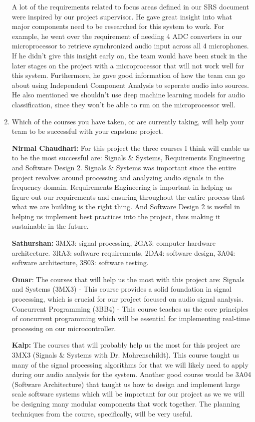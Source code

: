 \begin{enumerate}
  A lot of the requirements related to focus areas defined in our SRS document
  were inspired by our project supervisor. He gave great insight into what major
  components need to be researched for this system to work. For example, he went
  over the requirement of needing 4 ADC converters in our microprocessor to
  retrieve synchronized audio input across all 4 microphones. If he didn't give
  this insight early on, the team would have been stuck in the later stages on
  the project with a microprocessor that will not work well for this system.
  Furthermore, he gave good information of how the team can go about using
  Independent Component Analysis to seperate audio into sources. He also
  mentioned we shouldn't use deep machine learning models for audio
  classification, since they won't be able to run on the microprocessor well. 

  
  \item Which of the courses you have taken, or are currently taking, will help
  your team to be successful with your capstone project.

  \textbf{Nirmal Chaudhari: } For this project the three courses I think will
  enable us to be the most successful are: Signals \& Systems, Requirements
  Engineering and Software Design 2. Signals \& Systems was important since the
  entire project revolves around processing and analyzing audio signals in the
  frequency domain. Requirements Engineering is important in helping us figure
  out our requirements and ensuring throughout the entire process that what we
  are building is the right thing. And Software Design 2 is useful in helping us
  implement best practices into the project, thus making it sustainable in the
  future.

  \textbf{Sathurshan:} 3MX3: signal processing, 2GA3: computer hardware
  architecture. 3RA3: software requirements, 2DA4: software design, 3A04:
  software architecture, 3S03: software testing.

  \textbf{Omar}: The courses that will help us the most with this project are:
  Signals and Systems (3MX3) - This course provides a solid foundation in signal
  processing, which is crucial for our project focused on audio signal analysis.
  Concurrent Programming (3BB4) - This course teaches us the core principles of
  concurrent programming which will be essential for implementing real-time
  processing on our microcontroller.

  \textbf{Kalp:} The courses that will probably help us the most for this
  project are 3MX3 (Signals \& Systems with Dr. Mohrenschildt). This course
  taught us many of the signal processing algorithms for that we will likely
  need to apply during our audio analysis for the system. Another good course
  would be 3A04 (Software Architecture) that taught us how to design and
  implement large scale software systems which will be important for our project
  as we we will be designing many modular components that work together. The
  planning techniques from the course, specifically, will be very useful.


\end{enumerate}
